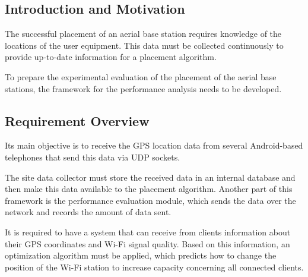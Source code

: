 \hypertarget{introduction-and-motivation-1}{%
\subsection{Introduction and
Motivation}\label{introduction-and-motivation-1}}

The successful placement of an aerial base station requires knowledge of
the locations of the user equipment. This data must be collected
continuously to provide up-to-date information for a placement
algorithm.

To prepare the experimental evaluation of the placement of the aerial
base stations, the framework for the performance analysis needs to be
developed.

\hypertarget{requirement-overview-1}{%
\subsection{Requirement Overview}\label{requirement-overview-1}}

Its main objective is to receive the GPS location data from several
Android-based telephones that send this data via UDP sockets.

The site data collector must store the received data in an internal
database and then make this data available to the placement algorithm.
Another part of this framework is the performance evaluation module,
which sends the data over the network and records the amount of data
sent.

It is required to have a system that can receive from clients
information about their GPS coordinates and Wi-Fi signal quality. Based
on this information, an optimization algorithm must be applied, which
predicts how to change the position of the Wi-Fi station to increase
capacity concerning all connected clients.
